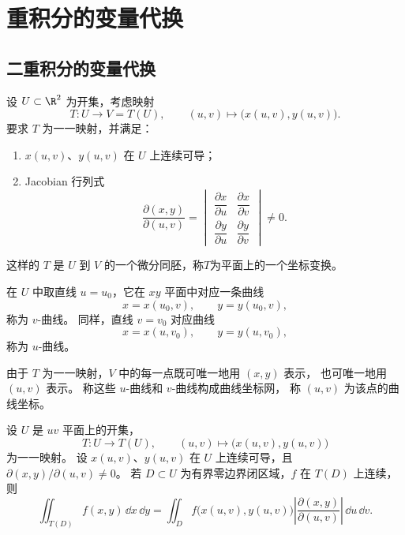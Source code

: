 \section{重积分的变量代换}
\subsection*{二重积分的变量代换}

\begin{definition}
	设 $U\subset\R^2$ 为开集，考虑映射
\[
T:U\longrightarrow V=T(U),\qquad
(u,v)\longmapsto\bigl(x(u,v),y(u,v)\bigr).
\]
要求 $T$ 为一一映射，并满足：
\begin{enumerate}
\item $x(u,v)$、$y(u,v)$ 在 $U$ 上连续可导；
\item Jacobian 行列式
\[
\frac{\partial(x,y)}{\partial(u,v)}
=\begin{vmatrix}
\dfrac{\partial x}{\partial u}&\dfrac{\partial x}{\partial v}\\[5pt]
\dfrac{\partial y}{\partial u}&\dfrac{\partial y}{\partial v}
\end{vmatrix}
\ne0.
\]
\end{enumerate}
这样的 $T$ 是 $U$ 到 $V$ 的一个微分同胚，称$T$为平面上的一个坐标变换。
\end{definition}

在 $U$ 中取直线 $u=u_0$，它在 $xy$ 平面中对应一条曲线
\[
x=x(u_0,v),\qquad y=y(u_0,v),
\]
称为 $v$-曲线。
同样，直线 $v=v_0$ 对应曲线
\[
x=x(u,v_0),\qquad y=y(u,v_0),
\]
称为 $u$-曲线。

由于 $T$ 为一一映射，$V$ 中的每一点既可唯一地用 $(x,y)$ 表示，
也可唯一地用 $(u,v)$ 表示。
称这些 $u$-曲线和 $v$-曲线构成曲线坐标网，
称 $(u,v)$ 为该点的曲线坐标。

\begin{center}

\end{center}

\begin{theorem}[二重积分的变量代换]\label{p2-double-change-of-variables}
设 $U$ 是 $uv$ 平面上的开集，
\[
T:U\longrightarrow T(U),\qquad
(u,v)\longmapsto\bigl(x(u,v),y(u,v)\bigr)
\]
为一一映射。
设 $x(u,v)$、$y(u,v)$ 在 $U$ 上连续可导，且
$\partial(x,y)/\partial(u,v)\ne0$。
若 $D\subset U$ 为有界零边界闭区域，$f$ 在 $T(D)$ 上连续，则
\[
\iint_{T(D)}f(x,y)\,\dd x\,\dd y
=\iint_D f\bigl(x(u,v),y(u,v)\bigr)
\left|\frac{\partial(x,y)}{\partial(u,v)}\right|
\,\dd u\,\dd v.
\]
\end{theorem}

